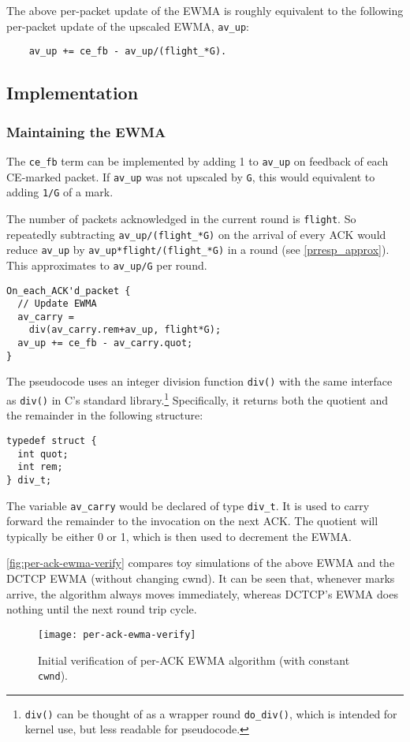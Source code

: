 The above per-packet update of the EWMA is roughly equivalent to the following
per-packet update of the upscaled EWMA, \texttt{av\_up}:
\begin{verbatim}
    av_up += ce_fb - av_up/(flight_*G).
\end{verbatim}

\subsection{Implementation}\label{prresp_implementation}

\subsubsection{Maintaining the EWMA}

The \texttt{ce\_fb} term can be implemented by adding 1 to \texttt{av\_up} on
feedback of each CE-marked packet. If \texttt{av\_up} was not upscaled by
\texttt{G}, this would equivalent to adding \texttt{1/G} of a mark.

The number of packets acknowledged in the current round is \texttt{flight}. So
repeatedly subtracting \texttt{av\_up/(flight\_*G)} on the arrival of every ACK
would reduce \texttt{av\_up} by \texttt{av\_up*flight/(flight\_*G)} in a round
(see \autoref{prresp_approx}). This approximates to \texttt{av\_up/G} per round.

\begin{verbatim}
On_each_ACK'd_packet {
  // Update EWMA
  av_carry = 
    div(av_carry.rem+av_up, flight*G);
  av_up += ce_fb - av_carry.quot;
}
\end{verbatim}

The pseudocode uses an integer division function \texttt{div()} with the same interface as \texttt{div()} in C's standard library.\footnote{\texttt{div()} can be thought of as a wrapper round \texttt{do\_div()}, which is intended for kernel use, but less readable for pseudocode.} Specifically, it returns both the quotient and the remainder in the following structure:
\begin{verbatim}
typedef struct {
  int quot;
  int rem;
} div_t;
\end{verbatim}
The variable \texttt{av\_carry} would be declared of type \texttt{div\_t}. It is used to carry forward the remainder to the invocation on the next ACK. The quotient will typically be either 0 or 1, which is then used to decrement the EWMA.

\autoref{fig:per-ack-ewma-verify} compares toy simulations of the above EWMA and
the DCTCP EWMA (without changing cwnd). It can be seen that, whenever marks
arrive, the algorithm always moves immediately, whereas DCTCP's EWMA does
nothing until the next round trip cycle.
\begin{figure}[h]
	\texttt{[image: per-ack-ewma-verify]}
	\caption{Initial verification of per-ACK EWMA algorithm (with constant \texttt{cwnd}).}\label{fig:per-ack-ewma-verify}
\end{figure}

